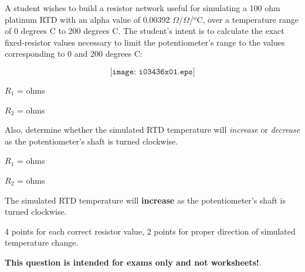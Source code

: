 

A student wishes to build a resistor network useful for simulating a 100 ohm platinum RTD with an alpha value of 0.00392 $\Omega$/$\Omega$/$^{o}$C, over a temperature range of 0 degrees C to 200 degrees C.  The student's intent is to calculate the exact fixed-resistor values necessary to limit the potentiometer's range to the values corresponding to 0 and 200 degrees C:

$$\texttt{[image: i03436x01.eps]}$$

$R_1$ = \underbar{\hskip 50pt} ohms

\vskip 10pt

$R_2$ = \underbar{\hskip 50pt} ohms

\vskip 10pt

Also, determine whether the simulated RTD temperature will {\it increase} or {\it decrease} as the potentiometer's shaft is turned clockwise.

\vskip 10pt







$R_1$ =  ohms

\vskip 10pt

$R_2$ =  ohms

\vskip 10pt

The simulated RTD temperature will {\bf increase} as the potentiometer's shaft is turned clockwise.

\vskip 10pt

4 points for each correct resistor value, 2 points for proper direction of simulated temperature change.







{\bf This question is intended for exams only and not worksheets!}.


